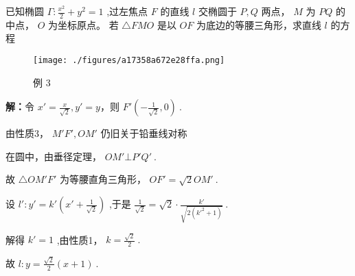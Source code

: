 \begin{example}{}
已知椭圆 $\displaystyle{\Gamma:\frac{x^2}{2}+y^2=1}$ ,过左焦点 $\displaystyle{F}$ 的直线 $\displaystyle{l}$ 交椭圆于 $\displaystyle{P,Q}$ 两点， $\displaystyle{M}$ 为 $\displaystyle{PQ}$ 的中点， $\displaystyle{O}$ 为坐标原点。 若 $\displaystyle{\triangle FMO}$ 是以 $\displaystyle{OF}$ 为底边的等腰三角形，求直线 $\displaystyle{l}$  的方程
\begin{figure}[ht]
\centering
\texttt{[image: ./figures/a17358a672e28ffa.png]}
\caption{例 3} \label{fig_affine_10}
\end{figure}
\textbf{解：}令 $\displaystyle{x'=\frac{x}{\sqrt{2}},y'=y}$，则 $\displaystyle{F'\left(-\frac{1}{\sqrt{2}},0\right)}~.$

由性质3， $\displaystyle{M'F',OM'}$ 仍旧关于铅垂线对称

在圆中，由垂径定理， $\displaystyle{OM'\bot P'Q'}~.$

故 $\displaystyle{\triangle OM'F'}$ 为等腰直角三角形， $\displaystyle{OF'=\sqrt{2} OM'}~.$

设 $\displaystyle{l':y'=k'\left(x'+\frac{1}{\sqrt{2}}\right)}$ ,于是 $\displaystyle{\frac{1}{\sqrt{2}}=\sqrt{2}\cdot \frac{k'}{\sqrt{2(k'^2+1)}}}~.$

解得 $\displaystyle{k'=1}$ ,由性质1， $\displaystyle{k=\frac{\sqrt{2}}{2}}~.$

故 $\displaystyle{l:y=\frac{\sqrt{2}}{2}(x+1)}~.$ 
\end{example}

